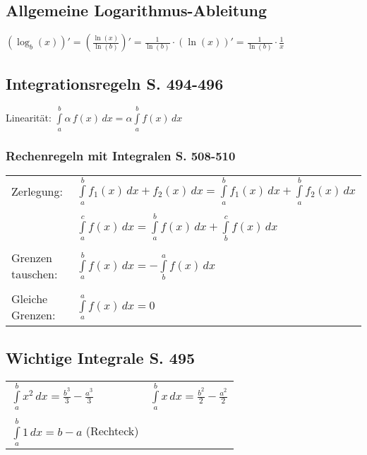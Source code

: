 			
			\subsection{Allgemeine Logarithmus-Ableitung}
			$(\log_b(x))' = \left( \frac{\ln(x)}{\ln(b)} \right)' = \frac{1}{\ln(b)} \cdot (\ln(x))' = \frac{1}{\ln(b)} \cdot \frac{1}{x} $
			
			
			
			
			\subsection{Integrationsregeln S. 494-496}
		Linearität: $\int \limits_{a}^{b} \alpha \, f(x) \, dx = \alpha \int \limits_{a}^{b} f(x) \, dx$ 
		
		
		\subsubsection{Rechenregeln mit Integralen S. 508-510}
		\begin{tabular}{ll}
		Zerlegung: & $\int \limits_{a}^{b} f_1(x) \, dx + f_2(x) \, dx = \int \limits_{a}^{b} f_1(x) \, dx + \int \limits_{a}^{b} f_2(x) \, dx$ \\
		\\		
		& $\int \limits_{a}^{c} f(x) \, dx = \int \limits_{a}^{b} f(x) \, dx + \int \limits_{b}^{c} f(x) \, dx$ \\
		\\
		Grenzen tauschen: & $ \int \limits_{a}^{b} f(x) \, dx = -  \int \limits_{b}^{a} f(x) \, dx $ \\
		\\
		Gleiche Grenzen: &  $\int \limits_{a}^{a} f(x) \, dx = 0$ \\
		\end{tabular}
		
		
		\subsection{Wichtige Integrale S. 495}
		\begin{tabular}{ll}
		$\int \limits_{a}^{b} x^2  \, dx = \frac{b^3}{3} - \frac{a^3}{3}$ & $\int \limits_{a}^{b} x \, dx = \frac{b^2}{2} - \frac{a^2}{2}$ \\
		\\
		$\int \limits_{a}^{b} 1 \, dx = b - a $ (Rechteck)& \\
		\end{tabular}
			
	
	